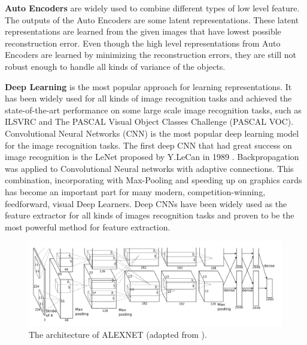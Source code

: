 \textbf{Auto Encoders} are widely used to combine different types of low level feature. The outputs of the Auto Encoders are some latent representations. These latent representations are learned from the given images that have lowest possible reconstruction error. Even though the high level representations from Auto Encoders are learned by minimizing the reconstruction errors, they are still not robust enough to handle all kinds of variance of the objects.

\textbf{Deep Learning} is the most popular approach for learning representations. It has been widely used for all kinds of image recognition tasks and achieved the state-of-the-art performance on some large scale image recognition tasks, such as ILSVRC and The PASCAL Visual Object Classes Challenge (PASCAL VOC). 
Convolutional Neural Networks (CNN) is the most popular deep learning model for the image recognition tasks. The first deep CNN that had great success on image recognition is the LeNet proposed by Y.LeCan in 1989 \cite{lecun1989backpropagation}. Backpropagation was applied to Convolutional Neural networks with adaptive connections. This combination, incorporating with Max-Pooling and speeding up on graphics cards has become an important part for  many modern, competition-winning, feedforward, visual Deep Learners. Deep CNNs have been widely used as the feature extractor for all kinds of images recognition tasks and proven to be the most powerful method for feature extraction.
\begin{figure}
	\centering
	\includegraphics[scale=.3]{introduction/fig/alexnet.png}
	\caption{The architecture of ALEXNET (adapted from \cite{krizhevsky2012imagenet}).}\label{fig:intro:alex}
\end{figure}

